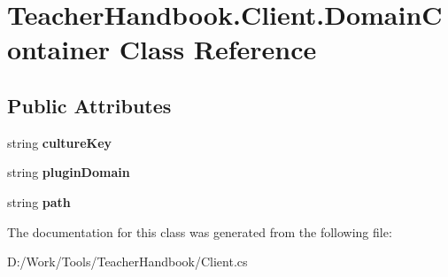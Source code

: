 \hypertarget{class_teacher_handbook_1_1_client_1_1_domain_container}{}\section{Teacher\+Handbook.\+Client.\+Domain\+Container Class Reference}
\label{class_teacher_handbook_1_1_client_1_1_domain_container}
\subsection*{Public Attributes}
\begin{DoxyCompactItemize}
\item 
\mbox{\label{class_teacher_handbook_1_1_client_1_1_domain_container_ae72edd58099a7ac8a146367a71b75d3e}} 
string {\bfseries culture\+Key}
\item 
\mbox{\label{class_teacher_handbook_1_1_client_1_1_domain_container_a369aa498ee2cf929f7b93dd02d70e2d2}} 
string {\bfseries plugin\+Domain}
\item 
\mbox{\label{class_teacher_handbook_1_1_client_1_1_domain_container_ac7941ee0cc4a0a462939c719e2b21c4d}} 
string {\bfseries path}
\end{DoxyCompactItemize}


The documentation for this class was generated from the following file\+:\begin{DoxyCompactItemize}
\item 
D\+:/\+Work/\+Tools/\+Teacher\+Handbook/Client.\+cs\end{DoxyCompactItemize}

